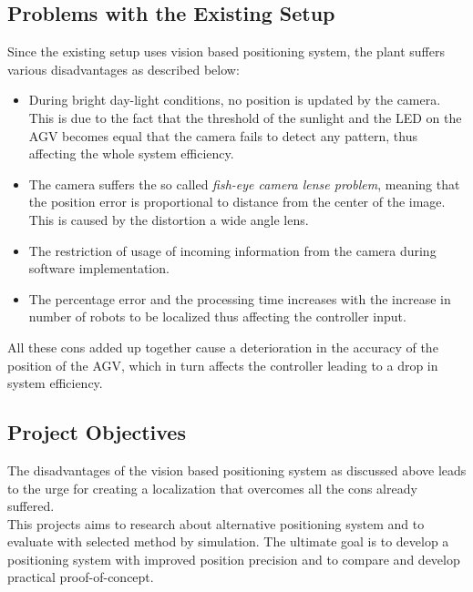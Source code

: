 \subsection{Problems with the Existing Setup}

Since the existing setup uses vision based positioning system, the plant suffers various disadvantages as described below:
\begin{itemize}
\item During bright day-light conditions, no position is updated by the camera. This is due to the fact that the threshold of the sunlight and the LED on the AGV becomes equal that the camera fails to detect any pattern, thus affecting the whole system efficiency.
\item The camera suffers the so called \textit{fish-eye camera lense problem}, meaning that the position error is proportional to  distance from the center of the image. This is caused by the distortion a wide angle lens.
\item The restriction of usage of incoming information from the camera during software implementation.
\item The percentage error and the processing time increases with the increase in number of robots to be localized thus affecting the controller input.
\end{itemize}


All these cons added up together cause a deterioration in the accuracy of the position of the AGV, which in turn affects the controller leading to a drop in system efficiency. 

\subsection{Project Objectives}

The disadvantages of the vision based positioning system as discussed above leads to the urge for creating a localization that overcomes all the cons already suffered.\\

This projects aims to research about alternative positioning system and to evaluate with selected method by simulation. The ultimate goal is to develop a positioning system with  improved position precision and to compare and develop practical proof-of-concept.

